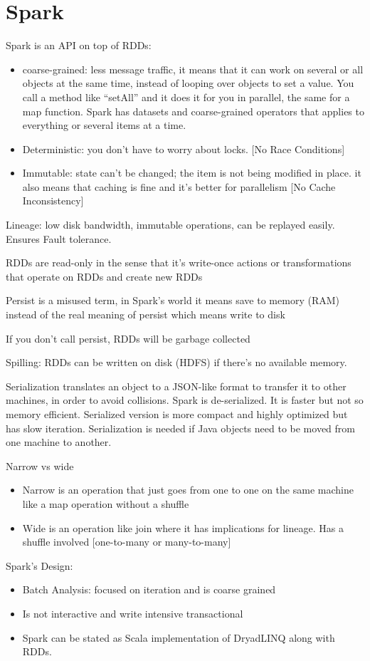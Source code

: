 \documentclass[twoside]{article}
\begin{document}
\section{Spark }
Spark is an API on top of RDDs:
\begin{itemize}
\item	coarse-grained: less message traffic, it means that it can work on several or all objects at the same time, instead of looping over objects to set a value. You call a method like “setAll” and it does it for you in parallel, the same for a map function. Spark has datasets and coarse-grained operators that applies to everything or several items at a time.
\item	Deterministic: you don’t have to worry about locks. [No Race Conditions]
\item	Immutable: state can’t be changed; the item is not being modified in place. it also means that caching is fine and it’s better for parallelism [No Cache Inconsistency]
\end{itemize}
Lineage: low disk bandwidth, immutable operations, can be replayed easily. Ensures Fault tolerance.
\par
RDDs are read-only in the sense that it’s write-once actions or transformations that operate on RDDs and create new RDDs
\par
Persist is a misused term, in Spark’s world it means save to memory (RAM) instead of the real meaning of persist which means write to disk 
\par If you don’t call persist, RDDs will be garbage collected
\par Spilling: RDDs can be written on disk (HDFS) if there’s no available memory.
\par Serialization translates an object to a JSON-like format to transfer it to other machines, in order to avoid collisions. Spark is de-serialized. It is faster but not so memory efficient. Serialized version is more compact and highly optimized but has slow iteration. Serialization is needed if Java objects need to be moved from one machine to another.

Narrow vs wide
\begin{itemize}
\item	Narrow is an operation that just goes from one to one on the same machine like a map operation without a shuffle 
\item	Wide is an operation like join where it has implications for lineage. Has a shuffle involved [one-to-many or many-to-many]
\end{itemize}
Spark’s Design:
\begin{itemize}
\item	Batch Analysis: focused on iteration and is coarse grained
\item	Is not interactive and write intensive transactional
\item	Spark can be stated as Scala implementation of DryadLINQ along with RDDs.
\end{itemize}
\end{document}
